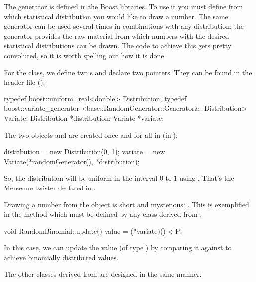 The generator is defined in the Boost libraries. To use it you must define from which statistical distribution you would like to draw a number. The same generator can be used several times in combinations with any distribution; the generator provides the raw material from which numbers with the desired statistical distributions can be drawn. The code to achieve this gets pretty convoluted, so it is worth spelling out how it is done.

For the  class, we define two s and declare two pointers. They can be found in the header file ():
\lstset{numbers=left}
\begin{cpp}
typedef boost::uniform_real<double> Distribution;
typedef boost::variate_generator
  <base::RandomGenerator::Generator&, 
   Distribution> Variate;
Distribution *distribution;
Variate *variate;
\end{cpp}
\lstset{numbers=none}
The two objects  and  are created once and for all in  (in ):
\lstset{numbers=left}
\begin{cpp}
distribution = new Distribution(0, 1);
variate = new Variate(*randomGenerator(), *distribution);
\end{cpp}
\lstset{numbers=none}
So, the distribution will be uniform in the interval 0 to 1 using . That's the Mersenne twister declared in . 

Drawing a number from the  object is short and mysterious: . This is exemplified in the  method which must be defined by any class derived from :
\lstset{numbers=left}
\begin{cpp}
void RandomBinomial::update() {
    value = (*variate)() < P;
}
\end{cpp}
\lstset{numbers=none}
In this case, we can update the value (of type ) by comparing it against  to achieve binomially distributed values.

The other classes derived from  are designed in the same manner.

